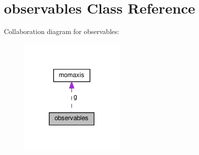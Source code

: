 \hypertarget{classobservables}{}\section{observables Class Reference}
\label{classobservables}


Collaboration diagram for observables\+:\nopagebreak
\begin{figure}[H]
\begin{center}
\leavevmode
\includegraphics[width=149pt]{classobservables__coll__graph}
\end{center}
\end{figure}
